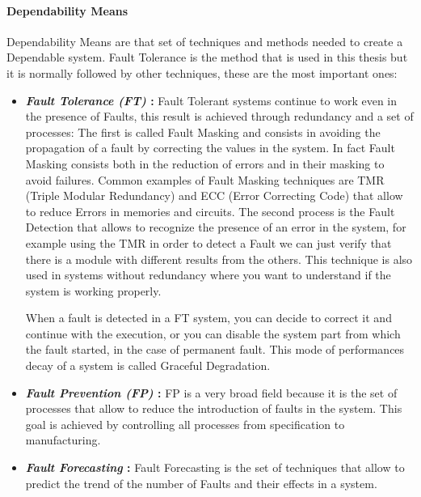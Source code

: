 {{{			\paragraph*{Dependability Means}{
				Dependability Means are that set of techniques and methods needed to create a Dependable system\cite{Dubrova2013}. Fault Tolerance is the method that is used in this thesis but it is normally followed by other techniques, these are the most important ones:
				\begin{itemize}
					\item \textbf{\textit{Fault Tolerance (FT)} : } Fault Tolerant systems continue to work even in the presence of Faults, this result is achieved through redundancy and a set of processes: The first is called Fault Masking and consists in avoiding the propagation of a fault by correcting the values in the system. In fact Fault Masking consists both in the reduction of errors and in their masking to avoid failures. Common examples of Fault Masking techniques are TMR (Triple Modular Redundancy) and ECC (Error Correcting Code) that allow to reduce Errors in memories and circuits. The second process is the Fault Detection that allows to recognize the presence of an error in the system, for example using the TMR in order to detect a Fault we can just verify that there is a module with different results from the others. This technique is also used in systems without redundancy where you want to understand if the system is working properly.
					
					When a fault is detected in a FT system, you can decide to correct it and continue with the execution, or you can disable the system part from which the fault started, in the case of permanent fault. This mode of performances decay of a system is called Graceful Degradation. 
					
					\item \textbf{\textit{Fault Prevention (FP)} : } FP is a very broad field because it is the set of processes that allow to reduce the introduction of faults in the system. This goal is achieved by controlling all processes from specification to manufacturing.
					
					\item \textbf{\textit{Fault Forecasting} : } Fault Forecasting is the set of techniques that allow to predict the trend of the number of Faults and their effects in a system.
					

\end{itemize}}}}}
